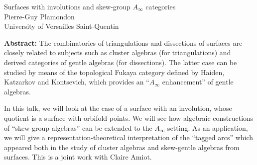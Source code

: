 \documentclass[12pt,a4paper]{article}
\begin{document}
\thispagestyle{empty} 
\begin{center}
{\large  Surfaces with involutions and skew-group $A_\infty$ categories}\\
\vspace*{.5cm}
Pierre-Guy Plamondon\\
University of Versailles Saint-Quentin\\
\end{center}
\vspace*{.8cm}

{\bf Abstract:} The combinatorics of triangulations and dissections of surfaces
are closely related to subjects such as cluster algebras (for
triangulations) and derived categories of gentle algebras (for
dissections).  The latter case can be studied by means of the topological
Fukaya category defined by Haiden, Katzarkov and Kontsevich, which
provides an ``$A_\infty$ enhancement'' of gentle algebras.

In this talk, we will look at the case of a surface with an involution,
whose quotient is a surface with orbifold points.  We will see how
algebraic constructions of ``skew-group algebras'' can be extended to the
$A_\infty$ setting.  As an application, we will give a
representation-theoretical interpretation of the ``tagged arcs'' which
appeared both in the study of cluster algebras and skew-gentle algebras
from surfaces.  This is a joint work with Claire Amiot.
\end{document}
